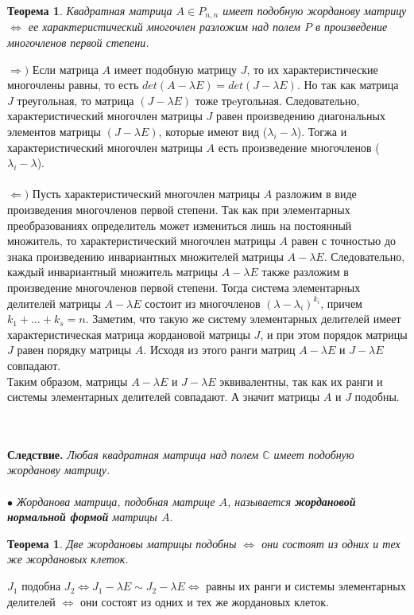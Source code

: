 \newtheorem*{th12_8_1}{Теорема}\begin{th12_8_1}Квадратная матрица $A\in P_{n,n}$ имеет подобную жорданову матрицу $\Longleftrightarrow$ ее характеристический многочлен разложим над полем $P$ в произведение многочленов первой степени.
\end{th12_8_1}\begin{Proof}
	$\Rightarrow)$ Если матрица $A$ имеет подобную матрицу $J$, то их характеристические многочлены равны, то есть $det(A- \lambda E) = det(J - \lambda E)$. Но так как матрица $J$ треугольная, то матрица $(J-\lambda E)$ тоже трeугольная. Следовательно, характеристический многочлен матрицы $J$ равен произведению диагональных элементов матрицы $(J-\lambda E)$, которые имеют вид ($\lambda_i - \lambda$). Тогжа и характеристический многочлен матрицы $A$ есть произведение многочленов  ($\lambda_i - \lambda$).\\\\
	$\Leftarrow)$ Пусть характеристический многочлен матрицы $A$ разложим в виде произведения многочленов первой степени. Так как при элементарных преобразованиях определитель может
	измениться лишь на постоянный множитель, то характеристический многочлен матрицы $A$
	равен с точностью до знака произведению инвариантных множителей матрицы $A - \lambda E$. Следовательно, каждый инвариантный множитель матрицы $A - \lambda E$ также разложим в произведение многочленов первой степени. Тогда система элементарных делителей матрицы $A - \lambda E$ состоит из многочленов $(\lambda - \lambda_i)^{k_i}$, причем $k_1 + \dots + k_s = n$. Заметим, что такую же систему элементарных делителей имеет характеристическая матрица жордановой матрицы $J$, и при этом порядок матрицы $J$ равен порядку матрицы $A$. Исходя из этого ранги матриц $A - \lambda E$ и $J -\lambda E$ совпадают.\\
	Таким образом, матрицы $A - \lambda E$ и $J -\lambda E$ эквивалентны, так как их ранги и системы элементарных делителей совпадают. А значит матрицы $A$ и $J$ подобны.
\end{Proof}\\\\
\textbf{Следствие.} \textit{Любая квадратная матрица над полем $\mathbb{C}$ имеет подобную жорданову матрицу.}\\\\
$\bullet$ \textit{Жорданова матрица, подобная матрице $A$, называется \textbf{жордановой нормальной формой} матрицы $A$}.
\newtheorem*{th12_8_2}{Теорема}\begin{th12_8_2}Две жордановы матрицы подобны $\Longleftrightarrow$ они состоят из одних и тех же жордановых клеток.
\end{th12_8_2}\begin{Proof}
	$J_1$ подобна $J_2 \Longleftrightarrow J_1 - \lambda E \sim J_2 - \lambda E \Longleftrightarrow$ равны их ранги и системы элементарных делителей $\Longleftrightarrow$ они состоят из одних и тех же жордановых клеток.
\end{Proof}
